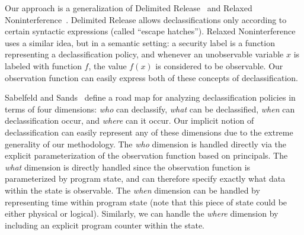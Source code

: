 Our approach is a generalization of Delimited
Release~\cite{delimited} and Relaxed 
Noninterference~\cite{relaxed}. Delimited Release allows
declassifications only according to certain syntactic 
expressions (called ``escape hatches''). Relaxed 
Noninterference uses a similar idea, but in a semantic
setting: a security label is a function representing a 
declassification policy, and
whenever an unobservable variable $x$ is labeled with 
function $f$, the value $f(x)$ is considered to be
observable. Our observation function can easily express 
both of these concepts of declassification.

Sabelfeld and Sands~\cite{sabelfeld-sands} define a road map 
for analyzing declassification policies in terms of four dimensions: \emph{who} can
declassify, \emph{what} can be declassified, \emph{when} can declassification occur, 
and \emph{where} can it occur. Our implicit notion of declassification can easily 
represent any of these dimensions due to the extreme generality of our methodology. 
The \emph{who} dimension is handled directly via the explicit parameterization of
the observation function based on principals. The \emph{what} dimension is directly handled 
since the observation function is parameterized by program state, and can therefore
specify exactly what data within the state is observable. The \emph{when} dimension can 
be handled by representing time within program state (note that this piece of state could 
be either physical or logical). Similarly, we can handle the 
\emph{where} dimension by including an explicit program counter within the state.

\begin{comment}
This semantic approach to security policies allows us to
specify declassifications without actually downgrading any
data from unobservable to observable. There are many security
systems that take a syntactic approach to declassification

Security typing: static vs dynamic, flow-sensitive
Flow-sensitive security types~\cite{hunt}
\end{comment}

